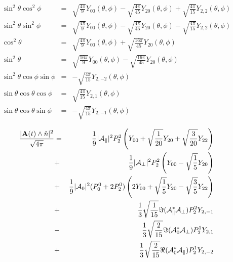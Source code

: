 \documentclass[a4paper,9pt,twoside]{article}
\begin{document}
\begin{eqnarray}
  \sin^2\theta \cos^2\phi &=& \sqrt{ \frac{4\pi}{9} } Y_{00}(\theta,\phi) - \sqrt{\frac{4\pi}{45} }Y_{20}(\theta,\phi) +\sqrt{\frac{4\pi}{15}} Y_{2,2}(\theta,\phi) \\
  \sin^2\theta \sin^2\phi &=& \sqrt{ \frac{4\pi}{9} } Y_{00}(\theta,\phi) - \sqrt{\frac{4\pi}{45} }Y_{20}(\theta,\phi) -\sqrt{\frac{4\pi}{15}} Y_{2,2}(\theta,\phi)  \\
  \cos^2\theta            &=& \sqrt{ \frac{4\pi}{9} } Y_{00}(\theta,\phi) + \sqrt{\frac{16\pi}{45}}Y_{20}(\theta,\phi)\\
  \sin^2\theta            &=& \sqrt{ \frac{16\pi}{9} } Y_{00}(\theta,\phi) - \sqrt{\frac{16\pi}{45}}Y_{20}(\theta,\phi)\\
  \sin^2\theta\cos\phi\sin\phi &=& -\sqrt{ \frac{4\pi}{15}} Y_{2,-2}(\theta,\phi) \\
  \sin\theta\cos\theta\cos\phi &=&  \sqrt{ \frac{4\pi}{15}} Y_{2,1}(\theta,\phi) \\ 
  \sin\theta\cos\theta\sin\phi &=& -\sqrt{ \frac{4\pi}{15}} Y_{2,-1}(\theta,\phi) 
\end{eqnarray}

\begin{eqnarray}
\frac{  |{ \bf A}(t) \wedge \hat{n}|^2 }{\sqrt{4\pi}}
                              &=&\frac{1}{9}|{\cal A}_\parallel|^2 P_2^2 \left( Y_{00}+\sqrt{\frac{1}{20}}Y_{20}+\sqrt{\frac{3}{20}}Y_{22}  \right)  \\
                              &+&\frac{1}{9}|{\cal A}_\perp|^2  P_2^2 \left( Y_{00} - \sqrt{\frac{1}{5}}Y_{20}\right)\\
                              &+&\frac{1}{9}|{\cal A}_0|^2  (P_0^0+2P_2^0 ) \left( 2 Y_{00}+\sqrt{\frac{1}{5}}Y_{20}-\sqrt{\frac{3}{5}}Y_{22} \right) \\
                              &+&\frac{1}{3}\sqrt{\frac{1}{15}}\Im({\cal A}_\parallel^*{\cal A}_\perp)P_2^2 Y_{2,-1}  \\
                              &-&\frac{1}{3}\sqrt{ \frac{2}{15}} \Im({\cal A}_0^* {\cal A}_\perp )P_2^1Y_{2,1} \\
                              &+&\frac{1}{3}\sqrt{ \frac{2}{15}}\Re({\cal A}_0^*{\cal A}_\parallel  )P_2^1 Y_{2,-2} 
\end{eqnarray}
\end{document}
